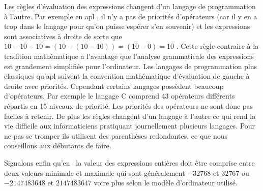 {\begin{minipage}{\myparboxwidth}
\smallskip

Les règles d'évaluation des expressions changent d'un langage de programmation à l'autre.
Par exemple en {\sc apl} \cite{iverson1}, il n'y a pas de priorités d'opérateurs (car il y en a
trop dans le langage pour qu'on puisse espérer s'en souvenir) et les expressions sont associatives 
à droite de sorte que $10 - 10 - 10 = (10 - (10 - 10)) = (10 - 0) = 10$ . Cette règle contraire
à la tradition mathématique a l'avantage que l'analyse grammaticale des expressions est grandement
simplifiée pour l'ordinateur. Les langages de programmation plus classiques qu'{\sc apl} sui\-vent la convention
mathématique d'évaluation de gauche à droite avec priorités.
Cependant certains langages possèdent beaucoup d'opérateurs.
Par exemple le langage {\sc C} \cite{kernighan1} comprend 43 opérateurs différents répartis en
15 niveaux de prio\-ri\-té.
Les priorités des opérateurs ne sont donc pas faciles à retenir. De plus les règles changent d'un langage à 
l'autre ce qui rend la vie difficile aux informaticiens
pratiquant journellement plusieurs langages. Pour ne pas se tromper ils utilisent des parenthèses
redondantes,
ce que nous conseillons aux débutants de faire.

Signalons enfin qu'en \pascal\ la valeur des expressions entières doit être comprise entre deux
valeurs minimale et maximale qui sont généralement $-32768$ et $32767$ ou
$-2147483648$ et $2147483647$ voire plus selon le modèle d'ordinateur utilisé.

\vspace{\abovedisplayskip}
\end{minipage}
}
